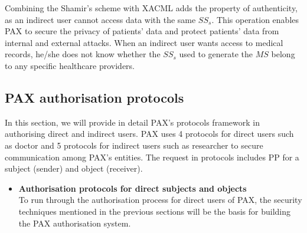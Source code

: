 \documentclass[journal,article,submit,moreauthors,pdftex]{Definitions/mdpi}
\begin{document}
\begin{itemize}
 Combining the Shamir's scheme with XACML adds the property of authenticity, as an indirect
 user cannot access data with the same $SS_s$. This operation enables PAX to secure the
 privacy of patients' data and protect patients' data from internal and external attacks.
 When an indirect user wants access to medical records, he/she does not know whether
 the $SS_s$ used to generate the $MS$ belong to any specific healthcare providers.

\subsection{PAX authorisation protocols}
In this section, we will provide in detail PAX's protocols framework in authorising direct and indirect users. PAX uses 4 protocols for direct users such as doctor and 5 protocols for indirect users such as researcher to secure communication among PAX’s entities. The request in protocols includes PP for a subject (sender) and object (receiver).
\begin{itemize}[topsep=0pt,itemsep=-1ex,partopsep=1ex,parsep=1ex]
\item \textbf{Authorisation protocols for direct subjects and objects}\\
To run through the authorisation process for direct users of PAX, the security techniques mentioned in the previous sections will be the basis for building the PAX authorisation system.


\end{itemize}
\end{itemize}
\end{document}
